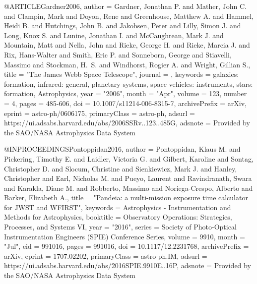 \documentclass{aa}
\begin{document}
{{{{{{{{{{{{{{@ARTICLE{Gardner2006,
       author = {{Gardner}, Jonathan P. and {Mather}, John C. and {Clampin}, Mark and
         {Doyon}, Rene and {Greenhouse}, Matthew A. and {Hammel}, Heidi B. and
         {Hutchings}, John B. and {Jakobsen}, Peter and {Lilly}, Simon J. and
         {Long}, Knox S. and {Lunine}, Jonathan I. and {McCaughrean}, Mark J. and
         {Mountain}, Matt and {Nella}, John and {Rieke}, George H. and
         {Rieke}, Marcia J. and {Rix}, Hans-Walter and {Smith}, Eric P. and
         {Sonneborn}, George and {Stiavelli}, Massimo and {Stockman}, H.~S. and
         {Windhorst}, Rogier A. and {Wright}, Gillian S.},
        title = "{The James Webb Space Telescope}",
      journal = {\ssr},
     keywords = {galaxies: formation, infrared: general, planetary systems, space vehicles: instruments, stars: formation, Astrophysics},
         year = "2006",
        month = "Apr",
       volume = {123},
       number = {4},
        pages = {485-606},
          doi = {10.1007/s11214-006-8315-7},
archivePrefix = {arXiv},
       eprint = {astro-ph/0606175},
 primaryClass = {astro-ph},
       adsurl = {https://ui.adsabs.harvard.edu/abs/2006SSRv..123..485G},
      adsnote = {Provided by the SAO/NASA Astrophysics Data System}
}

@INPROCEEDINGS{Pontoppidan2016,
       author = {{Pontoppidan}, Klaus M. and {Pickering}, Timothy E. and
         {Laidler}, Victoria G. and {Gilbert}, Karoline and
         {Sontag}, Christopher D. and {Slocum}, Christine and
         {Sienkiewicz}, Mark J. and {Hanley}, Christopher and
         {Earl}, Nicholas M. and {Pueyo}, Laurent and {Ravindranath}, Swara and
         {Karakla}, Diane M. and {Robberto}, Massimo and
         {Noriega-Crespo}, Alberto and {Barker}, Elizabeth A.},
        title = "{Pandeia: a multi-mission exposure time calculator for JWST and WFIRST}",
     keywords = {Astrophysics - Instrumentation and Methods for Astrophysics},
    booktitle = {Observatory Operations: Strategies, Processes, and Systems VI},
         year = "2016",
       series = {Society of Photo-Optical Instrumentation Engineers (SPIE) Conference Series},
       volume = {9910},
        month = "Jul",
          eid = {991016},
        pages = {991016},
          doi = {10.1117/12.2231768},
archivePrefix = {arXiv},
       eprint = {1707.02202},
 primaryClass = {astro-ph.IM},
       adsurl = {https://ui.adsabs.harvard.edu/abs/2016SPIE.9910E..16P},
      adsnote = {Provided by the SAO/NASA Astrophysics Data System}
}

}}}}}}}}}}}}}}
\end{document}
